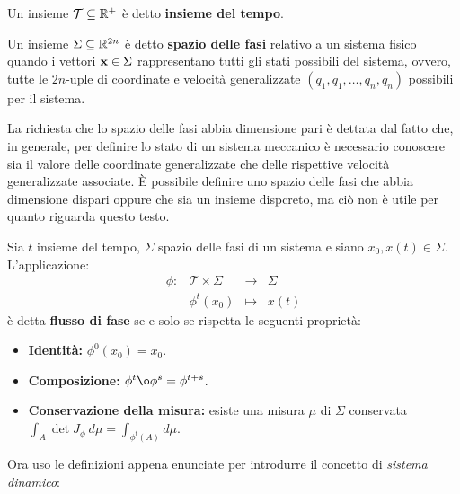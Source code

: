 \begin{definition}
    Un insieme $\mathcal T \subseteq \mathbb{R}^+$ è detto \textbf{insieme del tempo}.
\end{definition}

\begin{definition}
    Un insieme $\Sigma \subseteq \mathbb{R}^{2n}$ è detto \textbf{spazio delle fasi}
    relativo a un sistema fisico quando i vettori
     $\mathbf{x} \in \Sigma$ rappresentano tutti gli stati possibili
    del sistema, ovvero,
    tutte le $2n$-uple di coordinate e velocità generalizzate $(q_1, \dot q_1, \ldots, q_n, \dot q_n)$
    possibili per il sistema.
\end{definition}
La richiesta che lo spazio delle fasi abbia dimensione pari è dettata dal
fatto che, in generale, per definire lo stato di un sistema meccanico è
necessario conoscere sia il valore delle coordinate generalizzate
che delle rispettive velocità generalizzate associate.
È possibile definire uno spazio delle fasi che abbia dimensione dispari
oppure che sia un insieme dispcreto, ma ciò non è utile per quanto riguarda
questo testo. 

\begin{definition}
    Sia $t$ insieme del tempo, $\Sigma$ spazio delle fasi di un sistema e siano $x_0, x(t) \in \Sigma$.
    L'applicazione: \\
    \begin{equation*}
        \begin{array}{cccc}%
            \phi: &\mathcal T \times \Sigma &\to &\Sigma \\
            &\phi^t(x_0) &\mapsto &x(t)
        \end{array}%
    \end{equation*}
    è detta \textbf{flusso di fase} se e solo se rispetta le seguenti proprietà:
    \begin{itemize}
        \item \textbf{Identità:} $\phi^0(x_0) = x_0$.
        \item \textbf{Composizione:} $\phi^t \o \phi^s = \phi^{t+s}$.
        \item \textbf{Conservazione della misura:} esiste una misura $\mu$ di $\Sigma$ %
        conservata $\int_A \det J_\phi \ d\mu = \int_{\phi^t(A)} d\mu$.
    \end{itemize}
\end{definition}

Ora uso le definizioni appena enunciate per introdurre il concetto di
\emph{sistema dinamico}:

